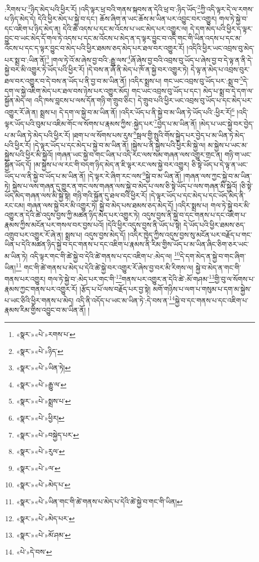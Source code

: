 :རིགས་པ་\footnote{«སྣར་»«པེ་»རགས་པ་}ཉིད་མེད་པའི་ཕྱིར་རོ། །འདི་ལྟར་ཕྲ་བའི་གནས་སྐབས་ན་དེའི་ཕྲ་བ་:ཉིད་ཡོད་\footnote{«སྣར་»«པེ་»ཉིད་}ཀྱི་འདི་ལྟར་དེ་ལ་རགས་པ་ཉིད་མེད་དེ། དེའི་ཕྱིར་མེད་པ་སྐྱེ་བ་དང་། ཆོས་ཞིག་ན་ཡང་ཆོས་མ་ཡིན་པར་འབྱུང་བར་འགྱུར། གལ་ཏེ་སྐྱེ་བ་དང་འཇིག་པ་ཉིད་མེད་ན། དེའི་ཚེ་འདས་པ་དང་མ་འོངས་པ་ཡང་མེད་པར་འགྱུར་ལ། དེ་དག་མེད་པའི་ཕྱིར་ད་ལྟར་བྱུང་བ་ཡང་མེད་དོ་གལ་ཏེ་འདས་པ་དང་མ་འོངས་པ་མེད་ན་ད་ལྟར་བྱུང་བ་འདི་གང་གི་ཡིན་འདས་པ་དང་མ་འོངས་པ་དང་ད་ལྟར་བྱུང་བ་མེད་པའི་ཕྱིར་ཐམས་ཅད་མེད་པར་ཐལ་བར་འགྱུར་རོ། །འདིའི་ཕྱིར་ཡང་འབྲས་བུ་མེད་པར་སྨྲ་བ་:ཡིན་ནོ།\footnote{«སྣར་»«པེ་»ཡིན་ཏེ།} །གལ་ཏེ་འོ་མ་ཞེས་བྱ་བའི་:རྒྱུ་ལས་\footnote{«སྣར་»«པེ་»རྒྱུ་ལ་}ཞོ་ཞེས་བྱ་བའི་འབྲས་བུ་ཡོད་པ་ཞེས་བྱ་བ་དེ་ལྟ་ན་ནི་དེ་སྐྱེ་བར་མི་འགྱུར་ཏེ་ཡོད་པའི་ཕྱིར་རོ། །དེ་བས་ན་ཞོ་ནི་མེད་པ་ཁོ་ན་སྐྱེ་བར་འགྱུར་ཏེ། དེ་ལྟ་ན་མེད་པ་འབྲས་བུར་ཐལ་བར་འགྱུར་བ་དེ་བས་ན་ཡོད་པ་ནི་བྱ་བ་མ་ཡིན་ནོ། །འདིར་སྨྲས་པ། གང་ཡང་འབྲས་བུ་ཡོད་པར་:སྨྲ་བ་\footnote{«སྣར་»«པེ་»སྨྲས་པ་}དེ་དག་ལ་སྐྱེ་འཇིག་མེད་པར་ཐལ་བས་ཉེས་པར་འགྱུར་མོད། གང་ཡང་འབྲས་བུ་ཡོད་པ་དང་། མེད་པ་སྨྲ་བ་དེ་དག་ལ་སྐྱོན་མེད་ལ། འདི་ཁས་བླངས་པ་ལས་དོན་གཉི་ག་གྲུབ་ཅིང་། དེ་གྲུབ་པའི་ཕྱིར་ཡང་འབྲས་བུ་ཡོད་པ་དང་མེད་པར་འགྱུར་རོ་ཞེ་ན། སྨྲས་པ། དེ་དག་ལ་སྐྱེ་བ་མ་ཡིན་ནོ། །འདིར་ཡོད་པ་ནི་སྐྱེ་བ་མ་ཡིན་ཏེ་ཡོད་པའི་:ཕྱིར་རོ།\footnote{«སྣར་»«པེ་»ཕྱིར།} །འདི་ལྟར་ཡོད་པའི་བུམ་པ་འཇིམ་གོང་ལ་སོགས་པ་རྣམས་ཀྱིས་:སྐྱེད་པར་\footnote{«སྣར་»«པེ་»བསྐྱེད་པར་}བྱེད་པ་མ་ཡིན་ནོ། །མེད་པ་ཡང་སྐྱེ་བར་བྱེད་པ་མ་ཡིན་ཏེ་མེད་པའི་ཕྱིར་རོ། །ཐག་པ་ལ་སོགས་པས་རུས་\footnote{«སྣར་»«པེ་»རུལ་}སྦལ་གྱི་སྤུའི་གོས་སྐྱེད་པར་བྱེད་པ་མ་ཡིན་ཏེ་མེད་པའི་ཕྱིར་རོ། །དེ་ལྟར་ཡོད་པ་དང་མེད་པ་སྐྱེ་བ་མ་ཡིན་ནོ། །སྐྱེས་པ་ནི་སྐྱེས་པའི་ཕྱིར་མི་སྐྱེ་ལ། མ་སྐྱེས་པ་ཡང་མ་སྐྱེས་པའི་ཕྱིར་མི་སྐྱེའོ། །གཞན་ཡང་སྐྱེ་བ་གང་ཡིན་པ་འདི་རང་ལས་སམ་གཞན་ལས་འགྱུར་གྲང་ན། གཉི་ག་ཡང་སྐྱོན་ཡོད་དོ། །མ་སྐྱེས་པ་ལ་རང་གི་བདག་ཉིད་མེད་ན་ཇི་ལྟར་རང་ལས་སྐྱེ་བར་འགྱུར། ཅི་སྟེ་ཡོད་པ་དེ་ལྟ་ན་ཡང་ཡོད་པ་ལ་ནི་སྐྱེ་བ་ཡོད་པ་མ་ཡིན་ནོ། །དེ་ལྟར་རེ་ཞིག་རང་ལས་\footnote{«སྣར་»«པེ་»ལ་}སྐྱེ་བ་མ་ཡིན་ནོ། །གཞན་ལས་ཀྱང་སྐྱེ་བ་མ་ཡིན་ཏེ། སྐྱེས་པ་ལས་གཞན་དུ་གྱུར་ན་གང་ལས་གཞན་ལས་སྐྱེ་བ་མེད་པ་ལས་ཅི་སྟེ་ཡོད་པ་ལས་གཞན་མི་སྐྱེའོ། །ཅི་སྟེ་ཡོད་མེད་གཞན་ལས་མི་སྐྱེ་སྟེ། གཉི་གའི་སྐྱོན་དུ་ཐལ་བའི་ཕྱིར་རོ། །དེ་ལྟར་ཡོད་པ་དང་མེད་པ་དང་ཡོད་མེད་ནི་རང་ངམ། གཞན་ལས་སྐྱེ་བར་མི་འགྱུར་ཏེ། སྐྱེ་བ་མེད་པས་ཐམས་ཅད་མེད་དོ། །འདིར་སྨྲས་པ། གལ་ཏེ་སྐྱེ་བར་མི་འགྱུར་ན་དེའི་ཚེ་འདུས་བྱས་ཀྱི་མཚན་ཉིད་མེད་པར་འགྱུར་ཏེ། འདུས་བྱས་ནི་སྐྱེ་བ་དང་གནས་པ་དང་འཇིག་པ་རྣམས་ཀྱིས་མངོན་པར་གསལ་བར་བྱས་པའོ། །དེའི་ཕྱིར་འདུས་བྱས་ནི་ཡོད་པ་སྟེ། དེ་ཡོད་པའི་ཕྱིར་ཐམས་ཅད་འགྲུབ་པར་འགྱུར་རོ་ཞེ་ན། སྨྲས་པ། འདུས་བྱས་མེད་དོ། །འདིར་ཁྱེད་ཀྱིས་འདུས་བྱས་སུ་མངོན་པར་བརྗོད་པ་གང་ཡིན་པ་དེའི་མཚན་ཉིད་སྐྱེ་བ་དང་གནས་པ་དང་འཇིག་པ་རྣམས་ནི་རིམ་གྱིས་ཡོད་པ་མ་ཡིན་ཞིང་ཅིག་ཅར་ཡང་མ་ཡིན་ཏེ། འདི་ལྟར་གང་གི་ཚེ་སྐྱེ་བ་དེའི་ཚེ་གནས་པ་དང་འཇིག་པ་:མེད་ལ། \footnote{«སྣར་»«པེ་»མེད་པ་}དེ་དག་མེད་ན་སྐྱེ་བ་གང་ཞིག་ཡིན།\footnote{«སྣར་»«པེ་»ཡིན་གང་གི་ཚེ་གནས་པ་མེད་པ་དེའི་ཚེ་སྐྱེ་བ་གང་གི་ཡིན།} གང་གི་ཚེ་གནས་པ་མེད་པ་དེའི་ཚེ་སྐྱེ་བར་འགྱུར་རོ་ཞེས་བྱ་བར་མི་རིགས་ལ། སྐྱེ་བ་མེད་ན་གང་གི་གནས་པར་འགྱུར། གལ་ཏེ་སྐྱེ་བ་:མེད་པར་གང་གི་\footnote{«སྣར་»«པེ་»མེད་པར་}གནས་པར་འགྱུར་ན་དེའི་ཚེ་:མོ་གཤམ་\footnote{«སྣར་»«པེ་»མོ་ཤམ་}གྱི་བུ་ལ་སོགས་པ་རྣམས་ཀྱང་གནས་པར་འགྱུར་རོ། །རྩོད་པ་པོ་ལས་བརྗོད་པར་བྱ་སྟེ། མགོ་གཉིས་པ་ལག་པ་གསུམ་པ་དག་མ་སྐྱེས་པ་ཡང་ཅིའི་ཕྱིར་གནས་པ་མེད། འདི་ནི་འདོད་པ་ཡང་མ་ཡིན་ཏེ་:དེ་བས་ན་\footnote{«པེ་»དེ་བས་}སྐྱེ་བ་དང་གནས་པ་དང་འཇིག་པ་རྣམས་རིམ་གྱིས་འབྱུང་བ་མ་ཡིན་ནོ། །
